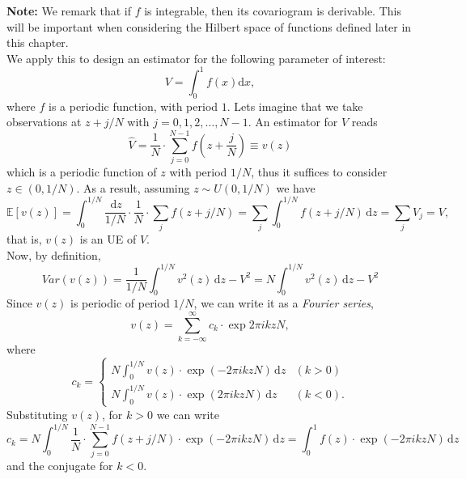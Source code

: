 \vspace{2mm}

\textbf{Note:} We remark that if $f$ is integrable, then its covariogram is derivable. This will be important when considering the Hilbert space of functions defined later in this chapter.\\%

We apply this to design an estimator for the following parameter of interest:
\begin{equation*}
    V = \int_0^1 f(x) \mathrm{d}x,
\end{equation*}
where $f$ is a periodic function, with period $1$.
Lets imagine that we take observations at $z+j/N$ with $j=0,1,2,\ldots, N-1$. An estimator for $V$ reads
\begin{equation*}
    \widehat{V} = \frac{1}{N} \cdot \sum_{j=0}^{N-1} f\left(z+\frac{j}{N}\right) \equiv v(z)
\end{equation*}
which is a periodic function of $z$ with period $1/N$, thus it suffices to consider $z\in (0,1/N)$. As a result, assuming $z \sim U(0,1/N)$ we have
\begin{equation*}
    \mathbb{E}[v(z)] = \int_0^{1/N} \frac{\,\mathrm{d}z}{1/N} \cdot \frac{1}{N}\cdot \sum_j f(z+j/N) = \sum_j \int_0^{1/N} f(z+j/N) \,\mathrm{d}z = \sum_j V_j = V,
\end{equation*}
that is, $v(z)$ is an UE of $V$.\\

Now, by definition,
\begin{equation*}
    Var(v(z)) = \frac{1}{1/N} \int_0^{1/N} v^2(z) \,\mathrm{d}z - V^2 = N \int_0^{1/N} v^2(z) \,\mathrm{d}z - V^2
\end{equation*}
Since $v(z)$ is periodic of period $1/N$, we can write it as a \textit{Fourier series},
\begin{equation*}
    v(z) = \sum_{k=-\infty}^{\infty} c_k \cdot \exp{2\pi i k zN},
\end{equation*}
where 
\begin{equation*}
    c_k = 
    \begin{cases}
         N \int_0^{1/N} v(z) \cdot \exp{(-2\pi i k z N)} \,\mathrm{d}z& (k>0)\\
         N \int_0^{1/N} v(z) \cdot \exp{(2\pi i k z N)} \,\mathrm{d}z& (k<0).
    \end{cases}
\end{equation*}
\vspace{2mm}
Substituting $v(z)$, for $k>0$ we can write
\begin{equation*}
    c_k = N \int_0^{1/N} \frac{1}{N} \cdot \sum_{j=0}^{N-1} f(z+j/N) \cdot \exp{(-2\pi i k z N)} \, \mathrm{d}z = \int_{0}^{1} f(z) \cdot \exp{(-2\pi i k z N)} \,\mathrm{d}z
\end{equation*}
and the conjugate for $k<0$.\\

